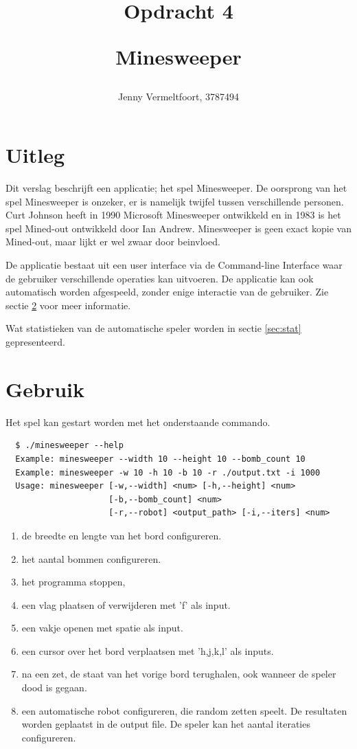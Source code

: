 \documentclass[10pt]{article}
\title{Opdracht 4 \\ \begin{large} Minesweeper\end{large}}
\author{Jenny Vermeltfoort, 3787494}
\begin{document}
\def\tablename{Tabel}

\maketitle

\section{Uitleg}
Dit verslag beschrijft een applicatie; het spel Minesweeper. De oorsprong van het spel Minesweeper is onzeker, er is
namelijk twijfel tussen verschillende personen. Curt Johnson heeft in 1990 Microsoft Minesweeper ontwikkeld en in 1983
is het spel Mined-out ontwikkeld door Ian Andrew\cite{wik-minsweep}. Minesweeper is geen exact kopie van Mined-out,
maar lijkt er wel zwaar door beinvloed\cite{wik-minout}.

De applicatie bestaat uit een user interface via de Command-line Interface waar de gebruiker verschillende operaties
kan uitvoeren. De applicatie kan ook automatisch worden afgespeeld, zonder enige interactie van de gebruiker. Zie
sectie \ref{sec:gebruik} voor meer informatie.

Wat statistieken van de automatische speler worden in sectie \ref{sec:stat} gepresenteerd.

\section{Gebruik}
\label{sec:gebruik}
Het spel kan gestart worden met het onderstaande commando.
\begin{verbatim}
  $ ./minesweeper --help
  Example: minesweeper --width 10 --height 10 --bomb_count 10
  Example: minesweeper -w 10 -h 10 -b 10 -r ./output.txt -i 1000
  Usage: minesweeper [-w,--width] <num> [-h,--height] <num> 
                     [-b,--bomb_count] <num> 
                     [-r,--robot] <output_path> [-i,--iters] <num>
\end{verbatim}

\begin{enumerate}
  \item de breedte en lengte van het bord configureren.
  \item het aantal bommen configureren.
  \item het programma stoppen,
  \item een vlag plaatsen of verwijderen met 'f' als input.
  \item een vakje openen met spatie als input.
  \item een cursor over het bord verplaatsen met 'h,j,k,l' als inputs.
  \item na een zet, de staat van het vorige bord terughalen, ook wanneer de speler dood is gegaan.
  \item een automatische robot configureren, die random zetten speelt. De resultaten worden geplaatst in de output
        file. De speler kan het aantal iteraties configureren.
\end{enumerate}
\end{document}
